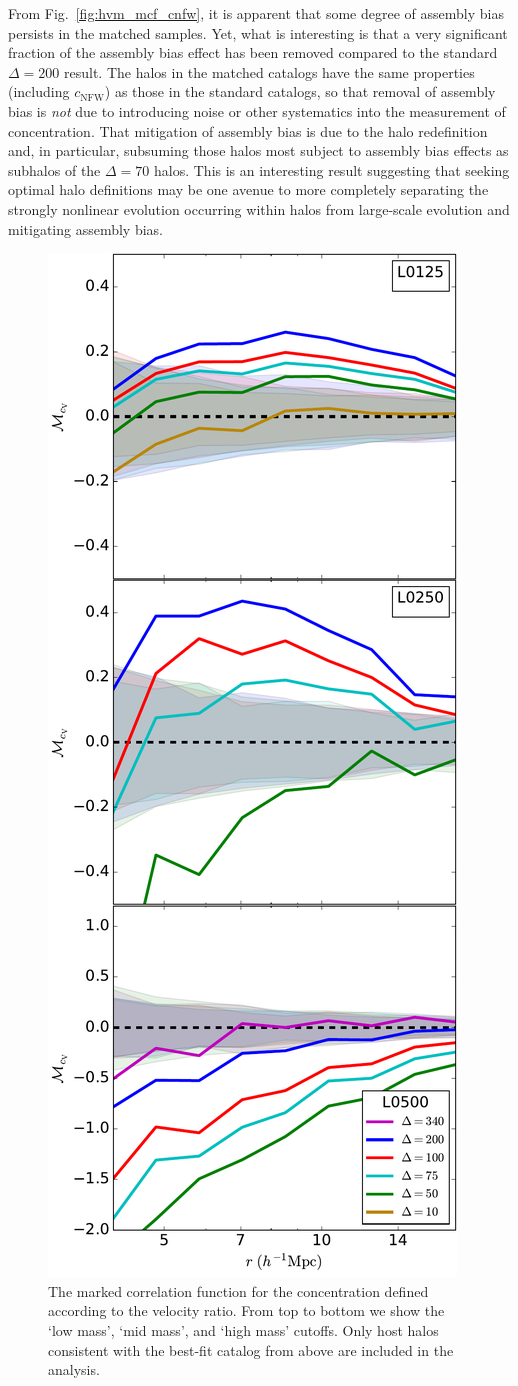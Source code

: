 \documentclass[usenatbib]{mnras}
\begin{document}
From Fig.~\ref{fig:hvm_mcf_cnfw}, it is apparent that some degree of assembly bias persists in the matched 
samples. Yet, what is interesting is that a very significant fraction of the assembly bias effect has been 
removed compared to the standard $\Delta=200$ result. The halos in the matched catalogs have the 
same properties (including $c_{\mathrm{NFW}}$) as those in the standard catalogs, so that removal 
of assembly bias is {\em not} due to introducing noise or other systematics into the measurement of 
concentration. That mitigation of assembly bias is due to the halo redefinition and, in particular, 
subsuming those halos most subject to assembly bias effects as subhalos of the $\Delta=70$ 
halos. This is an interesting result suggesting that seeking optimal halo definitions may be 
one avenue to more completely separating the strongly nonlinear evolution occurring within 
halos from large-scale evolution and mitigating assembly bias. 


\begin{figure}
	\centering
	\includegraphics[width=.4\textwidth]{match_mcf_cV.pdf}
	\caption{
	The marked correlation function for the concentration defined according to the velocity ratio. From top to bottom we show the `low mass', `mid mass', and `high mass' cutoffs. Only host halos consistent with the best-fit catalog from above are included in the analysis.}
	\label{fig:hvm_mcf_cV}
\end{figure}
\end{document}
